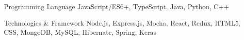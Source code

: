 

\begin{cvmyskills}

  \cvmyskill
    {Programming Language} %
    {JavaScript/ES6+, TypeScript, Java, Python, C++} %

  \cvmyskill
    {Technologies \& Framework} %
    {Node.js, Express.js, Mocha, React, Redux, HTML5, CSS, MongoDB, MySQL, Hibernate, Spring, Keras} %


\end{cvmyskills}

